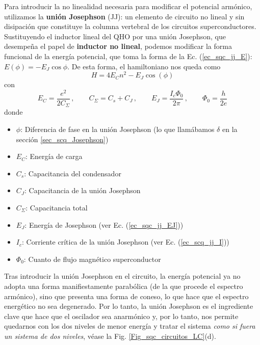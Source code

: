         Para introducir la no linealidad necesaria para modificar el potencial armónico, utilizamos la \textbf{unión Josephson} (JJ): un elemento de circuito no lineal y sin disipación que constituye la columna vertebral de los circuitos superconductores. Sustituyendo el inductor lineal del QHO por una unión Josephson, que desempeña el papel de \textbf{inductor no lineal}, podemos modificar la forma funcional de la energía potencial, que toma la forma de la Ec. (\ref{ec_sqc_jj_E}): $E(\phi) = -E_J \cos \phi$. De esta forma, el hamiltoniano nos queda como
        \begin{equation}  \label{ec_sqc_LCJJ_H}
            H = 4 E_C n^2 - E_J \cos (\phi)
        \end{equation}
        con 
        \begin{equation}
            E_C = \frac{e^2}{2 C_{\varSigma}}\,, 
            \qquad 
            C_{\varSigma} = C_s + C_J \, , 
            \qquad
            E_J = \frac{I_c \Phi_0}{2 \pi}\, ,
            \qquad
            \Phi_0 = \frac{h}{2e}
        \end{equation}
        donde 
        \begin{itemize}
            \item $\phi$: Diferencia de fase en la unión Josephson (lo que llamábamos $\delta$ en la sección \ref{sec_scq_Josephson})
            \item $E_C$: Energía de carga
            \item $C_s$: Capacitancia del condensador
            \item $C_J$: Capacitancia de la unión Josephson
            \item $C_{\varSigma}$: Capacitancia total
            \item $E_J$: Energía de Josephson (ver Ec. (\ref{ec_sqc_jj_EJ}))
            \item $I_c$: Corriente crítica de la unión Josephson (ver Ec. (\ref{ec_scq_jj_I}))
            \item $\Phi_0$: Cuanto de flujo magnético superconductor
        \end{itemize}


        Tras introducir la unión Josephson en el circuito, la energía potencial ya no adopta una forma manifiestamente parabólica (de la que procede el espectro armónico), sino que presenta una forma de coneso, lo que hace que el espectro energético no sea degenerado. Por lo tanto, la unión Josephson es el ingrediente clave que hace que el oscilador sea anarmónico y, por lo tanto, nos permite quedarnos con los dos niveles de menor energía y tratar el sistema \textit{como si fuera un sistema de dos niveles}, véase la Fig. \ref{Fig_sqc_circuitos_LC}(d).


